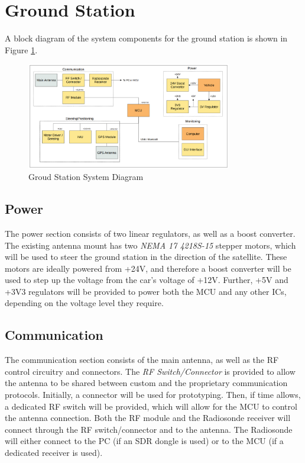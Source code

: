 \graphicspath{{./figures}}

\section{Ground Station}
A block diagram of the system components for the ground station is shown in Figure \ref{fig:gs_system}.

\begin{figure}[!htb]
  \centering
  \includegraphics[width=0.8\textwidth]{gs_system}
  \caption{Groud Station System Diagram}
  \label{fig:gs_system}
\end{figure}

\subsection{Power}
The power section consists of two linear regulators, as well as a boost converter. The existing antenna mount has two \textit{NEMA 17 4218S-15} stepper motors, which will be used to steer the ground station in the direction of the satellite. These motors are ideally powered from +24V, and therefore a boost converter will be used to step up the voltage from the car's voltage of +12V. Further, +5V and +3V3 regulators will be provided to power both the MCU and any other ICs, depending on the voltage level they require.

\subsection{Communication}
The communication section consists of the main antenna, as well as the RF control circuitry and connectors. The \textit{RF Switch/Connector} is provided to allow the antenna to be shared between custom and the proprietary communication protocols. Initially, a connector will be used for prototyping. Then, if time allows, a dedicated RF switch will be provided, which will allow for the MCU to control the antenna connection. Both the RF module and the Radiosonde receiver will connect through the RF switch/connector and to the antenna. The Radiosonde will either connect to the PC (if an SDR dongle is used) or to the MCU (if a dedicated receiver is used).

